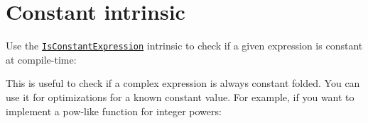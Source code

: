 \chapter{Constant intrinsic}
\hypertarget{md__hey_tea_9_2_library_2_package_cache_2com_8unity_8burst_0d1_88_87_2_documentation_0i_2optimization-constant}{}\label{md__hey_tea_9_2_library_2_package_cache_2com_8unity_8burst_0d1_88_87_2_documentation_0i_2optimization-constant}
\label{md__hey_tea_9_2_library_2_package_cache_2com_8unity_8burst_0d1_88_87_2_documentation_0i_2optimization-constant_autotoc_md418}%
%
 Use the \href{xref:Unity.Burst.CompilerServices.Constant.IsConstantExpression*}{\texttt{ {\ttfamily Is\+Constant\+Expression}}} intrinsic to check if a given expression is constant at compile-\/time\+:


\begin{DoxyCode}{0}
\DoxyCodeLine{\textcolor{preprocessor}{\ \#}}
\DoxyCodeLine{}
\DoxyCodeLine{}
\DoxyCodeLine{\{}
\DoxyCodeLine{\ \ \ \ \textcolor{comment}{//\ Burst\ knows\ that\ somethingWhichWillBeConstantFolded\ is\ a\ compile-\/time\ constant}}
\DoxyCodeLine{\}}

\end{DoxyCode}


This is useful to check if a complex expression is always constant folded. You can use it for optimizations for a known constant value. For example, if you want to implement a {\ttfamily pow}-\/like function for integer powers\+:



